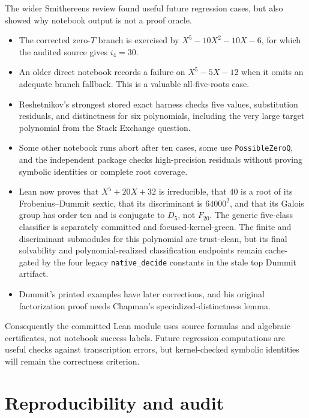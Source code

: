 \documentclass[11pt,a4paper,oneside]{article}
\newcommand{\lean}[1]{\nolinkurl{#1}}
\newcommand{\ii}[1]{i_{#1}}
\begin{document}
The wider Smithereens review found useful future regression cases, but also
showed why notebook output is not a proof oracle.

\begin{itemize}
\item The corrected zero-$T$ branch is exercised by
  $X^5-10X^2-10X-6$, for which the audited source gives $\ii4=30$.
\item An older direct notebook records a failure on $X^5-5X-12$ when it
  omits an adequate branch fallback.  This is a valuable all-five-roots case.
\item Reshetnikov's strongest stored exact harness checks five values,
  substitution residuals, and distinctness for six polynomials, including the
  very large target polynomial from the Stack Exchange question.
\item Some other notebook runs abort after ten cases, some use
  \lean{PossibleZeroQ}, and the independent package checks high-precision
  residuals without proving symbolic identities or complete root coverage.
\item Lean now proves that $X^5+20X+32$ is irreducible, that $40$ is a root
  of its Frobenius--Dummit sextic, that its discriminant is $64000^2$, and
  that its Galois group has order ten and is conjugate to $D_5$, not
  $F_{20}$.  The generic five-class classifier is separately committed and
  focused-kernel-green.  The finite and discriminant submodules for this
  polynomial are trust-clean, but its final solvability and polynomial-realized
  classification endpoints remain cache-gated by the four legacy
  \lean{native_decide} constants in the stale top Dummit artifact.
\item Dummit's printed examples have later corrections, and his original
  factorization proof needs Chapman's specialized-distinctness lemma.
\end{itemize}

Consequently the committed Lean module uses source formulas and algebraic
certificates, not notebook success labels.  Future regression computations are
useful checks against transcription errors, but kernel-checked symbolic
identities will remain the correctness criterion.

\section{Reproducibility and audit}
\end{document}
